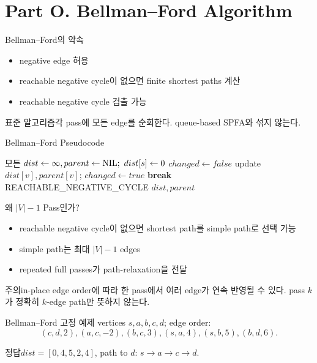 \section{Part O. Bellman--Ford Algorithm}
\begin{frame}{Bellman--Ford의 약속}
\begin{itemize}\item negative edge 허용\item reachable negative cycle이 없으면 finite shortest paths 계산\item reachable negative cycle 검출 가능\end{itemize}
\begin{alertblock}{표준 알고리즘}각 pass에 모든 edge를 순회한다. queue-based SPFA와 섞지 않는다.\end{alertblock}
\end{frame}
\begin{frame}{Bellman--Ford Pseudocode}
\scriptsize\begin{algorithmic}[1]
\State 모든 \(dist\gets\infty,parent\gets\NIL;\ dist[s]\gets0\)
\State \(changed\gets false\)
\State update \(dist[v],parent[v]\); \(changed\gets true\)\EndIf\EndFor
{}\State\textbf{break}\EndIf\EndFor
{}\State\Return REACHABLE\_NEGATIVE\_CYCLE\EndIf\EndFor
\State\Return \(dist,parent\)\EndProcedure
\end{algorithmic}
\end{frame}
\begin{frame}{왜 \(|V|-1\) Pass인가?}
\begin{itemize}\item reachable negative cycle이 없으면 shortest path를 simple path로 선택 가능\item simple path는 최대 \(|V|-1\) edges\item repeated full passes가 path-relaxation을 전달\end{itemize}
\begin{alertblock}{주의}in-place edge order에 따라 한 pass에서 여러 edge가 연속 반영될 수 있다. pass \(k\)가 정확히 \(k\)-edge path만 뜻하지 않는다.\end{alertblock}
\end{frame}
\begin{frame}{Bellman--Ford 고정 예제}
\small vertices \(s,a,b,c,d\); edge order:
\[
(c,d,2),(a,c,-2),(b,c,3),(s,a,4),(s,b,5),(b,d,6).
\]
\begin{block}{정답}\(dist=[0,4,5,2,4]\), path to \(d\): \(s\to a\to c\to d\).\end{block}
\end{frame}

